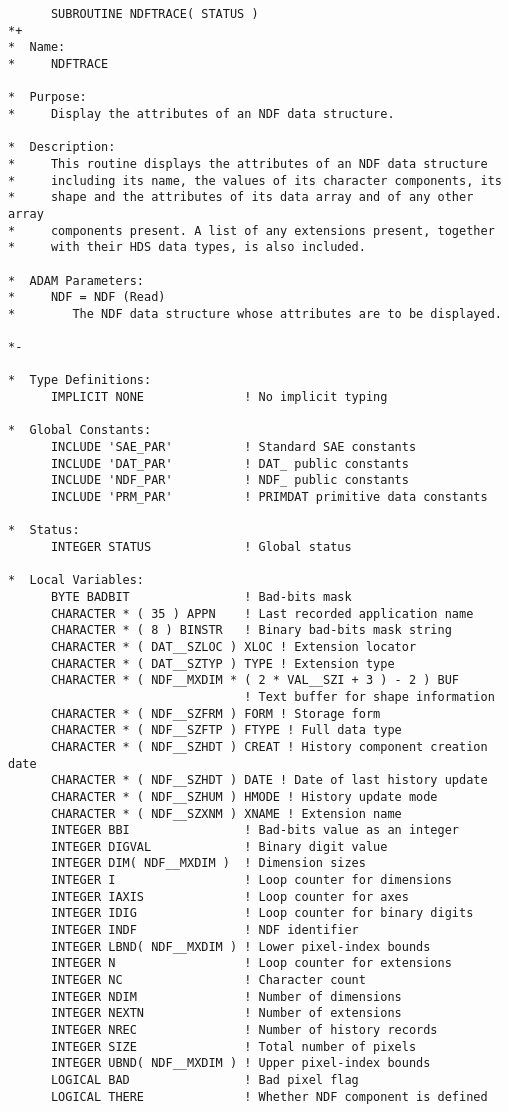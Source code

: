 \small
\begin{verbatim}
      SUBROUTINE NDFTRACE( STATUS )
*+
*  Name:
*     NDFTRACE

*  Purpose:
*     Display the attributes of an NDF data structure.

*  Description:
*     This routine displays the attributes of an NDF data structure
*     including its name, the values of its character components, its
*     shape and the attributes of its data array and of any other array
*     components present. A list of any extensions present, together
*     with their HDS data types, is also included.

*  ADAM Parameters:
*     NDF = NDF (Read)
*        The NDF data structure whose attributes are to be displayed.

*-
      
*  Type Definitions:
      IMPLICIT NONE              ! No implicit typing

*  Global Constants:
      INCLUDE 'SAE_PAR'          ! Standard SAE constants
      INCLUDE 'DAT_PAR'          ! DAT_ public constants
      INCLUDE 'NDF_PAR'          ! NDF_ public constants
      INCLUDE 'PRM_PAR'          ! PRIMDAT primitive data constants

*  Status:
      INTEGER STATUS             ! Global status

*  Local Variables:
      BYTE BADBIT                ! Bad-bits mask
      CHARACTER * ( 35 ) APPN    ! Last recorded application name
      CHARACTER * ( 8 ) BINSTR   ! Binary bad-bits mask string
      CHARACTER * ( DAT__SZLOC ) XLOC ! Extension locator
      CHARACTER * ( DAT__SZTYP ) TYPE ! Extension type
      CHARACTER * ( NDF__MXDIM * ( 2 * VAL__SZI + 3 ) - 2 ) BUF
                                 ! Text buffer for shape information
      CHARACTER * ( NDF__SZFRM ) FORM ! Storage form
      CHARACTER * ( NDF__SZFTP ) FTYPE ! Full data type
      CHARACTER * ( NDF__SZHDT ) CREAT ! History component creation date
      CHARACTER * ( NDF__SZHDT ) DATE ! Date of last history update
      CHARACTER * ( NDF__SZHUM ) HMODE ! History update mode
      CHARACTER * ( NDF__SZXNM ) XNAME ! Extension name
      INTEGER BBI                ! Bad-bits value as an integer
      INTEGER DIGVAL             ! Binary digit value
      INTEGER DIM( NDF__MXDIM )  ! Dimension sizes
      INTEGER I                  ! Loop counter for dimensions
      INTEGER IAXIS              ! Loop counter for axes
      INTEGER IDIG               ! Loop counter for binary digits
      INTEGER INDF               ! NDF identifier
      INTEGER LBND( NDF__MXDIM ) ! Lower pixel-index bounds
      INTEGER N                  ! Loop counter for extensions
      INTEGER NC                 ! Character count
      INTEGER NDIM               ! Number of dimensions
      INTEGER NEXTN              ! Number of extensions
      INTEGER NREC               ! Number of history records
      INTEGER SIZE               ! Total number of pixels
      INTEGER UBND( NDF__MXDIM ) ! Upper pixel-index bounds
      LOGICAL BAD                ! Bad pixel flag
      LOGICAL THERE              ! Whether NDF component is defined


\end{verbatim}
